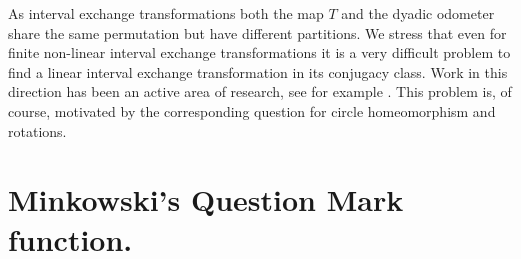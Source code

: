 \documentclass[letterpaper,10pt,reqno]{amsart}
\numberwithin{equation}{section}     %
\begin{document}
 
\begin{remark}
 As interval exchange transformations both the map $T$ and the dyadic odometer share the same permutation but have different partitions. We stress that even for finite non{{}{-}}linear interval exchange transformations it is a very difficult problem to find a linear interval exchange transformation in its conjugacy class. Work in this direction has been an active area of research, see for example \cite{mmy}. This problem is, of course,  motivated by the corresponding question for circle homeomorphism and  rotations.
 \end{remark}
  
 
 
\section{Minkowski's Question Mark function.}
\end{document}
